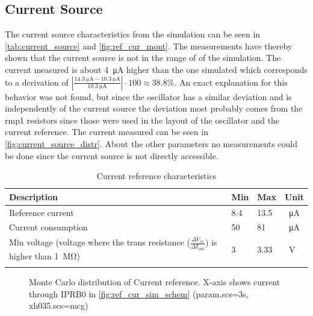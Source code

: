 \subsection{Current Source}
\label{subsubsec:current_source}
The current source characteristics from the simulation can be seen in \autoref{tab:current_source} and \autoref{fig:ref_cur_mont}. The measurements have thereby shown that the current source is not in the range of of the simulation. The current measured is about \qty{4}{\micro\ampere} higher than the one simulated which corresponds to a derivation of $\left|\frac{\qty{14.3}{\micro\ampere}-\qty{10.3}{\micro\ampere}}{\qty{10.3}{\micro\ampere}}\right|\cdot 100\approx 38.8 \%$. An exact explanation for this behavior was not found, but since the oscillator has a similar deviation and is independently of the current source the deviation most probably comes from the \glqq rmp1\grqq{} resistors since those were used in the layout of the oscillator and the current reference.
The current measured can be seen in \autoref{fig:current_source_distr}. About the other parameters no measurements could be done since the current source is not directly accessible.
\begin{longtable}{|p{3.5cm}|p{3.5cm}|p{3.5cm}|p{3.5cm}|}
	\hline
	\rowcolor{lightgray}
	\textbf{Description} &\textbf{Min} &\textbf{Max} & \textbf{Unit} \\ \hline
	
	Reference current & 8.4 & 13.5 &\qty{}{\micro\ampere} \\ \hline
	Current consumption & 50 & 81 & \qty{}{\micro\ampere} \\ \hline
	Min voltage (voltage where the trans resistance ($\frac{\Delta V_{in}}{\Delta I_{out}}$) is higher than \qty{1}{\mega\ohm}) & 3& 3.33 & \qty{}{\volt} \\ \hline
	\caption{Current reference characteristics} %
	\label{tab:current_source}
\end{longtable}
\begin{figure}[ht]
	\centering
	\caption{Monte Carlo distribution of Current reference. X-axis shows current through \glqq IPRB0\grqq{} in \autoref{fig:ref_cur_sim_schem} (param.scs=3s, xh035.scs=mcg)}
	\label{fig:ref_cur_mont}
\end{figure}

